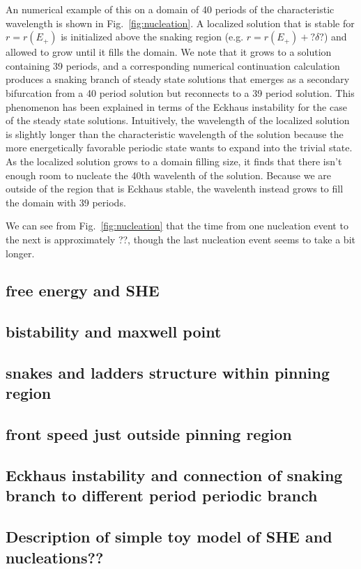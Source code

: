\documentclass[../main/TimeForcingSHE.tex]{subfiles}
\begin{document}
An numerical example of this on a domain of 40 periods of the characteristic wavelength is shown in Fig.~\ref{fig:nucleation}.  A localized solution that is stable for $r=r(E_+)$ is initialized above the snaking region (e.g. $r=r(E_+)+ ?\delta?$) and allowed to grow until it fills the domain. We note that it grows to a solution containing 39 periods, and a corresponding numerical continuation calculation produces a snaking branch of steady state solutions that emerges as a secondary bifurcation from a 40 period solution but reconnects to a 39 period solution.  This phenomenon has been explained \cite{bergeon2008} in terms of the Eckhaus instability for the case of the steady state solutions.  Intuitively, the wavelength of the localized solution is slightly longer than the characteristic wavelength of the solution because the more energetically favorable periodic state wants to expand into the trivial state.  As the localized solution grows to a domain filling size, it finds that there isn't enough room to nucleate the 40th wavelenth of the solution.  Because we are outside of the region that is Eckhaus stable, the wavelenth instead grows to fill the domain with 39 periods.

We can see from Fig.~\ref{fig:nucleation} that the time from one nucleation event to the next is approximately ??, though the last nucleation event seems to take a bit longer.  %

\subsection{free energy and SHE}
\subsection{bistability and maxwell point}
\subsection{snakes and ladders structure within pinning region}
\subsection{front speed just outside pinning region}
\subsection{Eckhaus instability and connection of snaking branch to different period periodic branch}
\subsection{Description of simple toy model of SHE and nucleations??}
\end{document}
